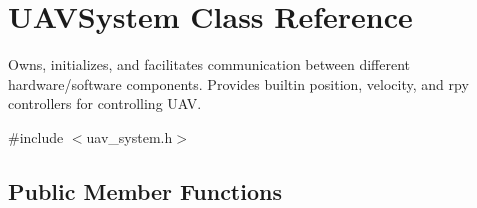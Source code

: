 \hypertarget{classUAVSystem}{\section{U\-A\-V\-System Class Reference}
\label{classUAVSystem}
}


Owns, initializes, and facilitates communication between different hardware/software components. Provides builtin position, velocity, and rpy controllers for controlling U\-A\-V.  




{\ttfamily \#include $<$uav\-\_\-system.\-h$>$}

\subsection*{Public Member Functions}
